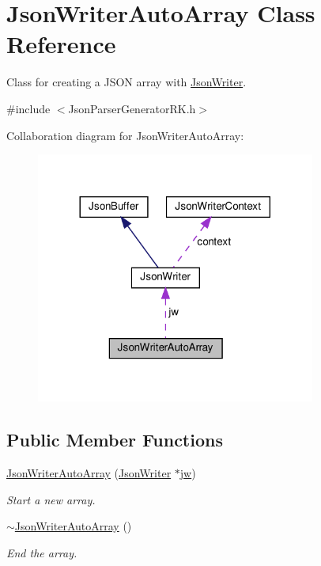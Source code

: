 \hypertarget{class_json_writer_auto_array}{}\section{Json\+Writer\+Auto\+Array Class Reference}
\label{class_json_writer_auto_array}


Class for creating a J\+S\+ON array with \hyperlink{class_json_writer}{Json\+Writer}.  




{\ttfamily \#include $<$Json\+Parser\+Generator\+R\+K.\+h$>$}



Collaboration diagram for Json\+Writer\+Auto\+Array\+:\nopagebreak
\begin{figure}[H]
\begin{center}
\leavevmode
\includegraphics[width=260pt]{class_json_writer_auto_array__coll__graph}
\end{center}
\end{figure}
\subsection*{Public Member Functions}
\begin{DoxyCompactItemize}
\item 
\hyperlink{class_json_writer_auto_array_a6bfd8fc01e5bcdd38cbf4b1c2e91637b}{Json\+Writer\+Auto\+Array} (\hyperlink{class_json_writer}{Json\+Writer} $\ast$\hyperlink{class_json_writer_auto_array_a747001de80facbc7a782a9e14ad2acae}{jw})
\begin{DoxyCompactList}\small\item\em Start a new array. \end{DoxyCompactList}\item 
\hyperlink{class_json_writer_auto_array_a2554fc87e46846becf528e878d043bc0}{$\sim$\+Json\+Writer\+Auto\+Array} ()
\begin{DoxyCompactList}\small\item\em End the array. \end{DoxyCompactList}\end{DoxyCompactItemize}
